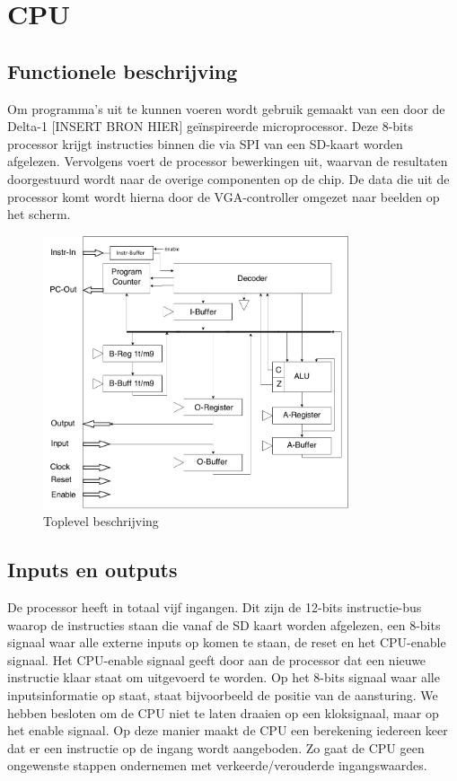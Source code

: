 \documentclass[oneside,dutch]{tudelft-report}
\begin{document}
\newpage

\chapter{CPU}
\section{Functionele beschrijving}
Om programma’s uit te kunnen voeren wordt gebruik gemaakt van een door de Delta-1 [INSERT BRON HIER] geïnspireerde microprocessor. Deze 8-bits processor krijgt instructies binnen die via SPI van een SD-kaart worden afgelezen. Vervolgens voert de processor bewerkingen uit, waarvan de resultaten doorgestuurd wordt naar de overige componenten op de chip. De data die uit de processor komt wordt hierna door de VGA-controller omgezet naar beelden op het scherm.

\begin{figure}[H]
\center
\includegraphics[width=9cm]{CPU-toplevel2}
\caption{Toplevel beschrijving}
\label{CPU}
\end{figure}

\section{Inputs en outputs}
De processor heeft in totaal vijf ingangen. Dit zijn de 12-bits instructie-bus waarop de instructies staan die vanaf de SD kaart worden afgelezen, een 8-bits signaal waar alle externe inputs op komen te staan, de reset en het CPU-enable signaal. Het CPU-enable signaal geeft door aan de processor dat een nieuwe instructie klaar staat om uitgevoerd te worden. Op het 8-bits signaal waar alle inputsinformatie op staat, staat bijvoorbeeld de positie van de aansturing.
We hebben besloten om de CPU niet te laten draaien op een kloksignaal, maar op het enable signaal. Op deze manier maakt de CPU een berekening iedereen keer dat er een instructie op de ingang wordt aangeboden. Zo gaat de CPU geen ongewenste stappen ondernemen met verkeerde/verouderde ingangswaardes. 
\end{document}
